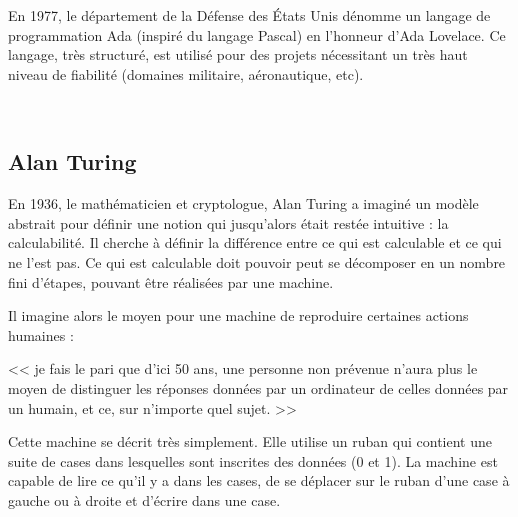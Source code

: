 \documentclass[a4paper,10pt]{report}
\theoremstyle{exo}
\theoremstyle{exercice}
\begin{document}
En 1977, le département de la Défense des États Unis dénomme un langage de programmation Ada (inspiré du langage Pascal) en l’honneur d’Ada Lovelace. Ce langage, très structuré, est utilisé pour des projets nécessitant un très haut niveau
de fiabilité (domaines militaire, aéronautique, etc).

\newpage
{}
~
\newpage
\subsection{Alan Turing}
En 1936, le mathématicien et cryptologue, Alan Turing a imaginé un modèle abstrait pour définir une notion qui jusqu'alors était restée intuitive : la calculabilité. Il cherche à définir la différence entre ce qui est calculable et ce qui ne l'est pas. Ce qui est calculable doit pouvoir peut se décomposer en un nombre fini d'étapes, pouvant être réalisées par une machine. 

Il imagine alors le moyen pour une machine de reproduire certaines actions humaines :

<< je fais le pari que d'ici 50 ans, une personne non prévenue n'aura plus le moyen de distinguer les réponses données par un ordinateur de celles données par un humain, et ce, sur n'importe quel sujet. >>

Cette machine se décrit très simplement. Elle utilise un ruban qui contient une suite de cases dans lesquelles sont inscrites des données (0 et 1). La machine est capable de lire ce qu'il y a dans les cases, de se déplacer sur le ruban d'une case à gauche ou à droite et d'écrire dans une case.
\end{document}

